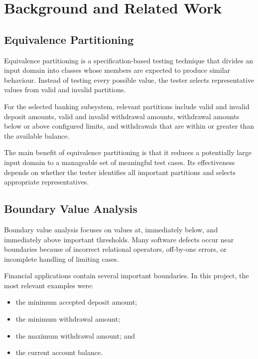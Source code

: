 \documentclass[12pt]{article}
\begin{document}

\section{Background and Related Work}

\subsection{Equivalence Partitioning}

Equivalence partitioning is a specification-based testing technique that
divides an input domain into classes whose members are expected to produce
similar behaviour. Instead of testing every possible value, the tester selects
representative values from valid and invalid partitions.

For the selected banking subsystem, relevant partitions include valid and
invalid deposit amounts, valid and invalid withdrawal amounts, withdrawal
amounts below or above configured limits, and withdrawals that are within or
greater than the available balance.

The main benefit of equivalence partitioning is that it reduces a potentially
large input domain to a manageable set of meaningful test cases. Its
effectiveness depends on whether the tester identifies all important
partitions and selects appropriate representatives.

\subsection{Boundary Value Analysis}

Boundary value analysis focuses on values at, immediately below, and
immediately above important thresholds. Many software defects occur near
boundaries because of incorrect relational operators, off-by-one errors, or
incomplete handling of limiting cases.

Financial applications contain several important boundaries. In this project,
the most relevant examples were:

\begin{itemize}
    \item the minimum accepted deposit amount;
    \item the minimum withdrawal amount;
    \item the maximum withdrawal amount; and
    \item the current account balance.
\end{itemize}
\end{document}
